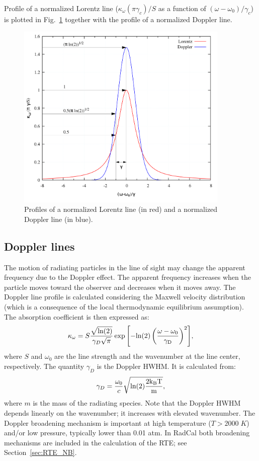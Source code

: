 Profile of a normalized Lorentz line ($\kappa_{\omega} (\pi \gamma_c)/S$ as a function of $(\omega-\omega_0)/\gamma_c $) is plotted in Fig.~\ref{fig:Lorentz_line} together with the profile of a normalized Doppler line.

\begin{figure}
\begin{center}
 \includegraphics[width=4.0in]{Figures/Lorentz_Doppler.png}
\end{center}
 \caption{Profiles of a normalized Lorentz line (in red) and a normalized Doppler line (in blue). \label{fig:Lorentz_line}}
\end{figure}

\subsection{Doppler lines}
The motion of radiating particles in the line of sight may change the apparent frequency due to the Doppler effect. The apparent frequency increases when the particle moves toward the observer and decreases when it moves away. The Doppler line profile is calculated considering the Maxwell velocity distribution (which is a consequence of the local thermodynamic equilibrium assumption). The absorption coefficient is then expressed as:
\begin{equation}
\kappa_{\omega} = S \dfrac{\displaystyle\sqrt{\rm ln(2) }}{ \gamma_D \displaystyle\sqrt{\pi} } \exp{\left[- \rm ln(2) \left( \dfrac{\omega-\omega_0}{\gamma_D} \right)^2 \right]},
\end{equation}
where $S$ and $\omega_0$ are the line strength and the wavenumber at the line center, respectively. The quantity $\gamma_D$ is the Doppler HWHM. It is calculated from:
\begin{equation}\label{eq::DopplerHWHM}
  \gamma_D = \displaystyle\frac{\omega_0}{c} \displaystyle\sqrt{\rm{ ln(2)} \displaystyle\frac{2 k_B T}{m} },
\end{equation}
where $m$ is the mass of the radiating species. Note that the Doppler HWHM depends linearly on the wavenumber; it increases with elevated wavenumber.
The Doppler broadening mechanism is important at high temperature ($T > 2000\;K$) \cite{Modest2013} and/or low pressure, typically lower than 0.01 atm.
In RadCal both broadening mechanisms are included in the calculation of the RTE; see Section~\ref{sec:RTE_NB}.


